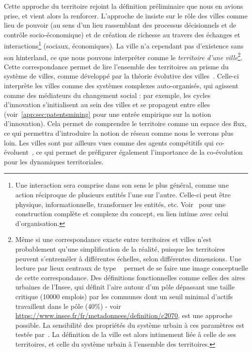 {Cette approche du territoire rejoint la définition préliminaire que nous en avions prise, et vient alors la renforcer. L'approche de  insiste sur le rôle des villes comme lieu de pouvoir (au sens d'un lieu rassemblant des processus décisionnels et de contrôle socio-économique) et de création de richesse au travers des échanges et interactions\footnote{Une interaction sera comprise dans son sens le plus général, comme une action réciproque de plusieurs entités l'une sur l'autre. Celle-ci peut être physique, informationnelle, transformer les entités, etc. Voir~\cite{morin1976methode} pour une construction complète et complexe du concept, en lien intime avec celui d'organisation.} (sociaux, économiques). La ville n'a cependant pas d'existence sans son hinterland, ce que nous pouvons interpréter comme le \emph{territoire d'une ville}\footnote{Même si une correspondance exacte entre territoires et villes n'est probablement qu'une simplification de la réalité, puisque les territoires peuvent s'entremêler à différentes échelles, selon différentes dimensions. Une lecture par lieux centraux de type ~\cite{banos2011christaller} permet de se faire une image conceptuelle de cette correspondance. Des définitions fonctionnelles comme celles des aires urbaines de l'Insee, qui définit l'aire autour d'un pôle dépassant une taille critique (10000 emplois) par les communes dont un seuil minimal d'actifs travaillent dans le pôle (40\%) - voir \url{https://www.insee.fr/fr/metadonnees/definition/c2070}, est une approche possible. La sensibilité des propriétés du système urbain à ces paramètres est testée par~\cite{2015arXiv150707878C}. La définition de la ville est alors intimement liée à celle de ses territoires, et celle du système urbain à l'ensemble des territoires.}. Cette correspondance permet de lire l'ensemble des territoires au prisme du système de villes, comme développé par la théorie évolutive des villes~\cite{pumain2010theorie}. Celle-ci interprète les villes comme des systèmes complexes auto-organisés, qui agissent comme des médiateurs du changement social : par exemple, les cycles d'innovation s'initialisent au sein des villes et se propagent entre elles (voir~\ref{app:sec:patentsmining} pour une entrée empirique sur la notion d'innovation). Cela permet de comprendre le territoire comme un espace des flux, ce qui permettra d'introduire la notion de réseau comme nous le verrons plus loin. Les villes sont par ailleurs vues comme des agents compétitifs qui co-évoluent~\cite{paulus2004coevolution}, ce qui permet de préfigurer également l'importance de la co-évolution pour les dynamiques territoriales.
}



